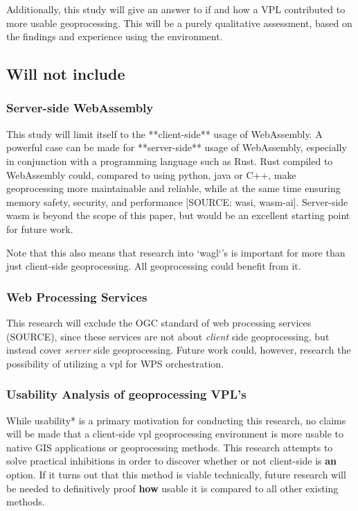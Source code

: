 Additionally, this study will give an answer to if and how a VPL contributed to more usable geoprocessing. This will be a purely qualitative assessment, based on the findings and experience using the environment.  


\subsection*{Will not include}

\subsubsection*{Server-side WebAssembly} %

This study will limit itself to the **client-side** usage of WebAssembly. 
A powerful case can be made for **server-side** usage of WebAssembly, especially in conjunction with a programming language such as Rust. 
Rust compiled to WebAssembly could, compared to using python, java or C++, make geoprocessing more maintainable and reliable, while at the same time ensuring memory safety, security, and performance [SOURCE: wasi, wasm-ai]. 
Server-side wasm is beyond the scope of this paper, but would be an excellent starting point for future work. 

Note that this also means that research into `wagl`'s is important for more than just client-side geoprocessing. All geoprocessing could benefit from it.



\subsubsection*{Web Processing Services} %

This research will exclude the OGC standard of web processing services (SOURCE), since these services are not about \emph{client} side geoprocessing, but instead cover \emph{server} side geoprocessing. 
Future work could, however, research the possibility of utilizing a vpl for WPS orchestration. 



\subsubsection*{Usability Analysis of geoprocessing VPL's} %

While usability* is a primary motivation for conducting this research, no claims will be made that a client-side vpl geoprocessing environment is more usable to native GIS applications or geoprocessing methods. This research attempts to solve practical inhibitions in order to discover whether or not client-side is \textbf{an} option. If it turns out that this method is viable technically, future research will be needed to definitively proof \textbf{how} usable it is compared to all other existing methods.  

